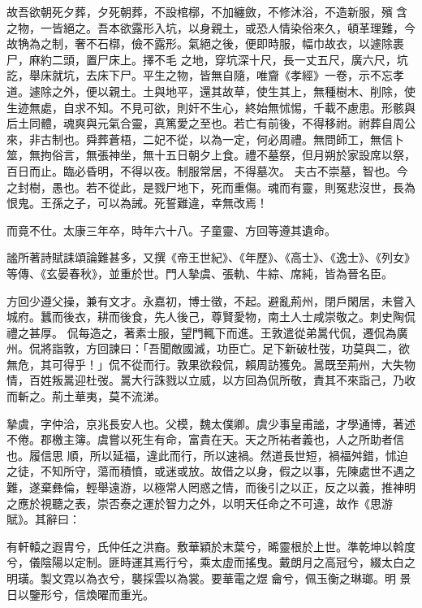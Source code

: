 \begin{pinyinscope}
 故吾欲朝死夕葬，夕死朝葬，不設棺槨，不加纏斂，不修沐浴，不造新服，殯含之物，一皆絕之。吾本欲露形入坑，以身親土，或恐人情染俗來久，頓革理難，今故觕為之制，奢不石槨，儉不露形。氣絕之後，便即時服，幅巾故衣，以遽除裹尸，麻約二頭，置尸床上。擇不毛
 之地，穿坑深十尺，長一丈五尺，廣六尺，坑訖，舉床就坑，去床下尸。平生之物，皆無自隨，唯齎《孝經》一卷，示不忘孝道。遽除之外，便以親土。土與地平，還其故草，使生其上，無種樹木、削除，使生迹無處，自求不知。不見可欲，則奸不生心，終始無怵惕，千載不慮患。形骸與后土同體，魂爽與元氣合靈，真篤愛之至也。若亡有前後，不得移祔。祔葬自周公來，非古制也。舜葬蒼梧，二妃不從，以為一定，何必周禮。無問師工，無信卜筮，無拘俗言，無張神坐，無十五日朝夕上食。禮不墓祭，但月朔於家設席以祭，百日而止。臨必昏明，不得以夜。制服常居，不得墓次。
 夫古不崇墓，智也。今之封樹，愚也。若不從此，是戮尸地下，死而重傷。魂而有靈，則冤悲沒世，長為恨鬼。王孫之子，可以為誡。死誓難違，幸無改焉！



 而竟不仕。太康三年卒，時年六十八。子童靈、方回等遵其遺命。



 謐所著詩賦誄頌論難甚多，又撰《帝王世紀》、《年歷》、《高士》、《逸士》、《列女》等傳、《玄晏春秋》，並重於世。門人摯虞、張軌、牛綜、席純，皆為晉名臣。



 方回少遵父操，兼有文才。永嘉初，博士徵，不起。避亂荊州，閉戶閑居，未嘗入城府。蠶而後衣，耕而後食，先人後己，尊賢愛物，南土人士咸崇敬之。刺史陶侃禮之甚厚。
 侃每造之，著素士服，望門輒下而進。王敦遣從弟暠代侃，遷侃為廣州。侃將詣敦，方回諫曰：「吾聞敵國滅，功臣亡。足下新破杜弢，功莫與二，欲無危，其可得乎！」侃不從而行。敦果欲殺侃，賴周訪獲免。暠既至荊州，大失物情，百姓叛暠迎杜弢。暠大行誅戮以立威，以方回為侃所敬，責其不來詣己，乃收而斬之。荊土華夷，莫不流涕。



 摯虞，字仲洽，京兆長安人也。父模，魏太僕卿。虞少事皇甫謐，才學通博，著述不倦。郡檄主簿。虞嘗以死生有命，富貴在天。天之所祐者義也，人之所助者信也。履信思
 順，所以延福，違此而行，所以速禍。然道長世短，禍福舛錯，怵迫之徒，不知所守，蕩而積憤，或迷或放。故借之以身，假之以事，先陳處世不遇之難，遂棄彝倫，輕舉遠游，以極常人罔惑之情，而後引之以正，反之以義，推神明之應於視聽之表，崇否泰之運於智力之外，以明天任命之不可違，故作《思游賦》。其辭曰：



 有軒轅之遐胄兮，氏仲任之洪裔。敷華穎於末葉兮，晞靈根於上世。準乾坤以斡度兮，儀陰陽以定制。匪時運其焉行兮，乘太虛而搖曳。戴朗月之高冠兮，綴太白之明璜。製文霓以為衣兮，襲採雲以為裳。要華電之煜龠兮，佩玉衡之琳瑯。明
 景日以鑒形兮，信煥曜而重光。




\end{pinyinscope}
